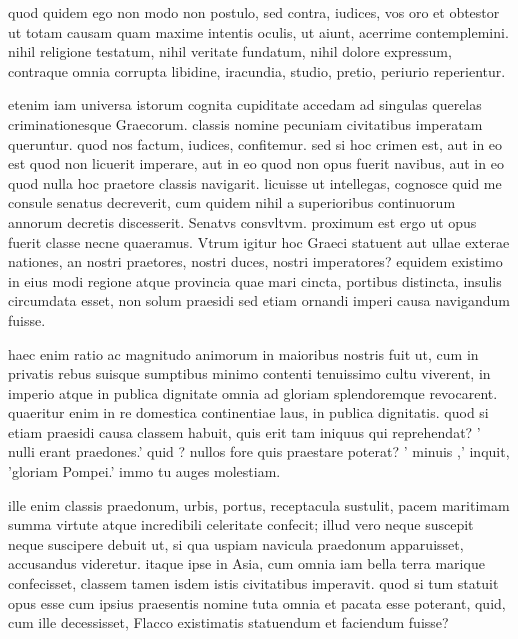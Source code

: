  quod quidem ego non modo non postulo, sed contra, iudices, vos oro et obtestor ut totam causam quam maxime intentis oculis, ut aiunt, acerrime contemplemini. nihil religione testatum, nihil veritate fundatum, nihil dolore expressum, contraque omnia corrupta libidine, iracundia, studio, pretio, periurio reperientur.

 etenim iam universa istorum cognita cupiditate accedam ad singulas querelas criminationesque Graecorum. classis nomine pecuniam civitatibus imperatam queruntur. quod nos factum, iudices, confitemur. sed si hoc crimen est, aut in eo est quod non licuerit imperare, aut in eo quod non opus fuerit navibus, aut in eo quod nulla hoc praetore classis navigarit. licuisse ut intellegas, cognosce quid me consule senatus decreverit, cum quidem nihil a superioribus continuorum annorum decretis discesserit. Senatvs consvltvm. proximum est ergo ut opus fuerit classe necne quaeramus. Vtrum igitur hoc Graeci statuent aut ullae exterae nationes, an nostri praetores, nostri duces, nostri imperatores? equidem existimo in eius modi regione atque provincia quae mari cincta, portibus distincta, insulis circumdata esset, non solum praesidi sed etiam ornandi imperi causa navigandum fuisse.

 haec enim ratio ac magnitudo animorum in maioribus nostris fuit ut, cum in privatis rebus suisque sumptibus minimo contenti tenuissimo cultu viverent, in imperio atque in publica dignitate omnia ad gloriam splendoremque revocarent. quaeritur enim in re domestica continentiae laus, in publica dignitatis. quod si etiam praesidi causa classem habuit, quis erit tam iniquus qui reprehendat? ' nulli erant praedones.' quid ? nullos fore quis praestare poterat? ' minuis ,' inquit, 'gloriam Pompei.' immo tu auges molestiam.

 ille enim classis praedonum, urbis, portus, receptacula sustulit, pacem maritimam summa virtute atque incredibili celeritate confecit; illud vero neque suscepit neque suscipere debuit ut, si qua uspiam navicula praedonum apparuisset, accusandus videretur. itaque ipse in Asia, cum omnia iam bella terra marique confecisset, classem tamen isdem istis civitatibus imperavit. quod si tum statuit opus esse cum ipsius praesentis nomine tuta omnia et pacata esse poterant, quid, cum ille decessisset, Flacco existimatis statuendum et faciendum fuisse?

